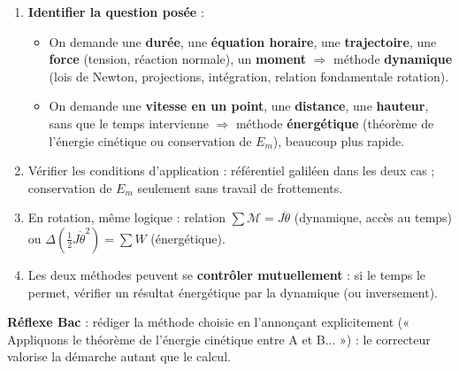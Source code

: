 \documentclass[11pt]{article}
\begin{document}
\begin{methode}
\begin{enumerate}
\item \textbf{Identifier la question posée} :
\begin{itemize}
\item On demande une \textbf{durée}, une \textbf{équation horaire}, une \textbf{trajectoire}, une \textbf{force} (tension, réaction normale), un \textbf{moment} $\Rightarrow$ méthode \textbf{dynamique} (lois de Newton, projections, intégration, relation fondamentale rotation).
\item On demande une \textbf{vitesse en un point}, une \textbf{distance}, une \textbf{hauteur}, sans que le temps intervienne $\Rightarrow$ méthode \textbf{énergétique} (théorème de l'énergie cinétique ou conservation de $E_m$), beaucoup plus rapide.
\end{itemize}
\item Vérifier les conditions d'application : référentiel galiléen dans les deux cas ; conservation de $E_m$ seulement sans travail de frottements.
\item En rotation, même logique : relation $\sum \mathcal{M} = J\ddot{\theta}$ (dynamique, accès au temps) ou $\Delta(\tfrac{1}{2}J\dot{\theta}^2) = \sum W$ (énergétique).
\item Les deux méthodes peuvent se \textbf{contrôler mutuellement} : si le temps le permet, vérifier un résultat énergétique par la dynamique (ou inversement).
\end{enumerate}
\textbf{Réflexe Bac} : rédiger la méthode choisie en l'annonçant explicitement (« Appliquons le théorème de l'énergie cinétique entre A et B... ») : le correcteur valorise la démarche autant que le calcul.
\end{methode}
\end{document}
